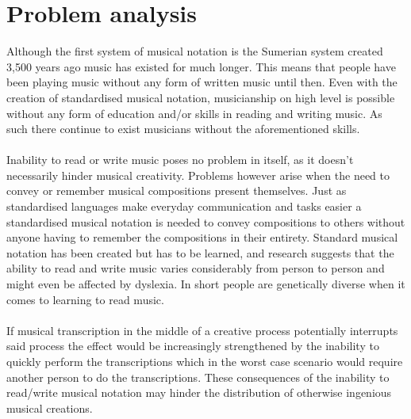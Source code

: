 \section{Problem analysis}
Although the first system of musical notation is the Sumerian system created 3,500 years ago music has existed for much longer. \cite{origins} This means that people have been playing music without any form of written music until then. Even with the creation of standardised musical notation, musicianship on high level is possible without any form of education and/or skills in reading and writing music. As such there continue to exist musicians without the aforementioned skills. \\\\
Inability to read or write music poses no problem in itself, as it doesn't necessarily hinder musical creativity. Problems however arise when the need to convey or remember musical compositions present themselves. Just as standardised languages make everyday communication and tasks easier a standardised musical notation is needed to convey compositions to others without anyone having to remember the compositions in their entirety. Standard musical notation has been created but has to be learned, and research suggests that the ability to read and write music varies considerably from person to person and might even be affected by dyslexia. \cite{dyslexia} In short people are genetically diverse when it comes to learning to read music.\\\\
If musical transcription in the middle of a creative process potentially interrupts said process the effect would be increasingly strengthened by the inability to quickly perform the transcriptions which in the worst case scenario would require another person to do the transcriptions. These consequences of the inability to read/write musical notation may hinder the distribution of otherwise ingenious musical creations.
